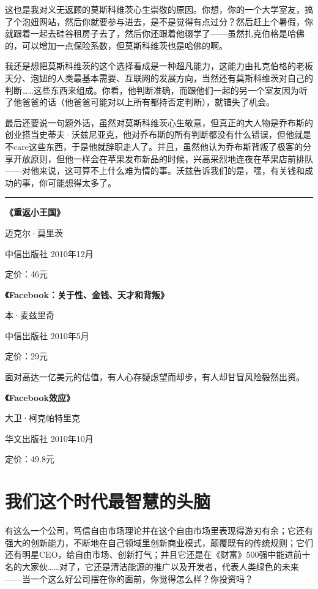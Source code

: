 这也是我对义无返顾的莫斯科维茨心生崇敬的原因。你想，你的一个大学室友，搞了个泡妞网站，然后你就要参与进去，是不是觉得有点过分？然后赶上个暑假，你就跟着一起去硅谷租房子去了，然后你还跟着他辍学了------虽然扎克伯格是哈佛的，可以增加一点保险系数，但莫斯科维茨也是哈佛的啊。

我还是想把莫斯科维茨的这个选择看成是一种超凡能力，这能力由扎克伯格的老板天分、泡妞的人类最基本需要、互联网的发展方向，当然还有莫斯科维茨对自己的判断\ldots{}\ldots{}这些东西来组成。你看，他判断准确，而跟他们一起的另一个室友因为听了他爸爸的话（他爸爸可能对以上所有都持否定判断），就错失了机会。

最后还要说一句题外话，虽然对莫斯科维茨心生敬意，但真正的大人物是乔布斯的创业搭当史蒂夫·沃兹尼亚克，他对乔布斯的所有判断都没有什么错误，但他就是不care这些东西，于是他就辞职走人了。并且，虽然他认为乔布斯背叛了极客的分享开放原则，但他一样会在苹果发布新品的时候，兴高采烈地连夜在苹果店前排队------对他来说，这可算不上什么难为情的事。沃兹告诉我们的是，嘿，有关钱和成功的事，你可能想得太多了。

\begin{center}\rule{3in}{0.4pt}\end{center}

\textbf{《重返小王国》}

迈克尔·莫里茨

中信出版社 2010年12月

定价：46元

\textbf{《Facebook：关于性、金钱、天才和背叛》}

本·麦兹里奇

中信出版社 2010年5月

定价：29元

面对高达一亿美元的估值，有人心存疑虑望而却步，有人却甘冒风险毅然出资。

\textbf{《Facebook效应》}

大卫·柯克帕特里克

华文出版社 2010年10月

定价：49.8元

\section{我们这个时代最智慧的头脑}

有这么一个公司，笃信自由市场理论并在这个自由市场里表现得游刃有余；它还有强大的创新能力，不断地在自己领域里创新商业模式，颠覆既有的传统规则；它们还有明星CEO，给自由市场、创新打气；并且它还是在《财富》500强中能进前十名的大家伙\ldots{}\ldots{}对了，它还是清洁能源的推广以及开发者，代表人类绿色的未来------当一个这么好公司摆在你的面前，你觉得怎么样？你投资吗？

